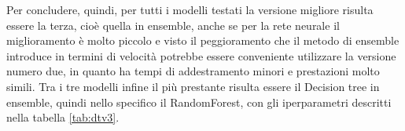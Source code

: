 Per concludere, quindi, per tutti i modelli testati la versione migliore risulta essere la terza, cioè quella in ensemble, anche se per la rete neurale il miglioramento è molto piccolo e visto il peggioramento che il metodo di ensemble introduce in termini di velocità potrebbe essere conveniente utilizzare la versione numero due, in quanto ha tempi di addestramento minori e prestazioni molto simili. Tra i tre modelli infine il più prestante risulta essere il Decision tree in ensemble, quindi nello specifico il RandomForest, con gli iperparametri descritti nella tabella \ref{tab:dtv3}.